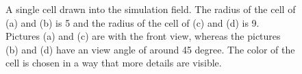 \begin{figure}
	\begin{center}
	\end{center}
	\begin{center}
	\end{center}
	\caption{\label{img:DrawnSphereCellRadius5And9}A single cell drawn into the simulation field. The radius of the cell of (a) and (b) is 5 and the radius of the cell of (c) and (d) is 9. Pictures (a) and (c) are with the front view, whereas the
pictures (b) and (d) have an view angle of around 45 degree. The color of the cell is chosen in
a way that more details are visible.}
\end{figure}

